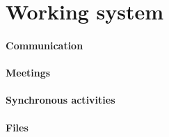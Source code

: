\section{Working system} \label{sec:protocols}

\paragraph{Communication} \lipsum[3]

\paragraph{Meetings} \lipsum[3]

\paragraph{Synchronous activities} \lipsum[3]

\paragraph{Files} \lipsum[3]